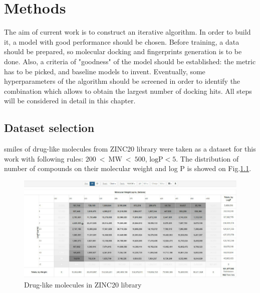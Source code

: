\chapter{Methods}

The aim of current work is to construct an iterative algorithm.
In order to build it, a model with good performance should be chosen.
Before training, a data should be prepared, so molecular docking and fingerprints generation is to be done.
Also, a criteria of "goodness" of the model should be established: the metric has to be picked, and baseline models to invent.
Eventually, some hyperparameters of the algorithm should be screened in order to identify the combination which allows to obtain the largest number of docking hits. All steps will be considered in detail in this chapter.
\section{Dataset selection}

\acrshort{smiles} of drug-like molecules from ZINC20 library were taken as a dataset for this work with following rules: $200\ <\ \text{MW}\ <\ 500$, $\text{logP} < 5$.
The distribution of number of compounds on their molecular weight and log P is showed on  Fig.\ref{zinc}.


\begin{figure}[H]
    \centering
    \includegraphics[scale=0.35]{Images/zinc.jpg}
    \caption{Drug-like molecules in ZINC20 library}
   \label{zinc}
\end{figure}

